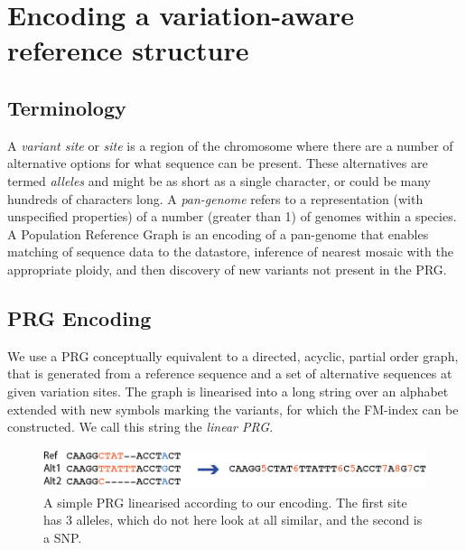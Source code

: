 \documentclass[runningheads,a4paper]{llncs}
\begin{document}
\section{Encoding a variation-aware reference structure}

\subsection{Terminology}
A \textit{variant site} or \textit{site} is a region of the chromosome where there are a number of alternative options for what sequence can be present.
These alternatives are termed \textit{alleles} and might be as short as a single character, or could be many hundreds of characters long. A \textit{pan-genome} refers to a representation (with unspecified properties) of a number (greater than 1) of genomes within a species. A Population Reference Graph is an encoding of a pan-genome that enables matching of sequence data to the datastore, inference of nearest mosaic with the appropriate ploidy, and then discovery of new variants not present in the PRG. 

\subsection{PRG Encoding}



We use a  PRG conceptually equivalent to a directed, acyclic, partial order graph, that is generated from a reference sequence and a set of alternative sequences at given variation sites. The graph is linearised into a long string over an alphabet extended with new symbols marking the variants, for which the FM-index can be constructed. We call this string the \textit{linear PRG}.


\begin{figure}
\centering
\includegraphics[height=1.2cm]{fig2_encoding.png}
\caption{A simple PRG linearised according to our encoding. The first site has 3 alleles, which do not here look at all similar, and the second is a SNP.}
\label{lab3}
\end{figure}
\end{document}
